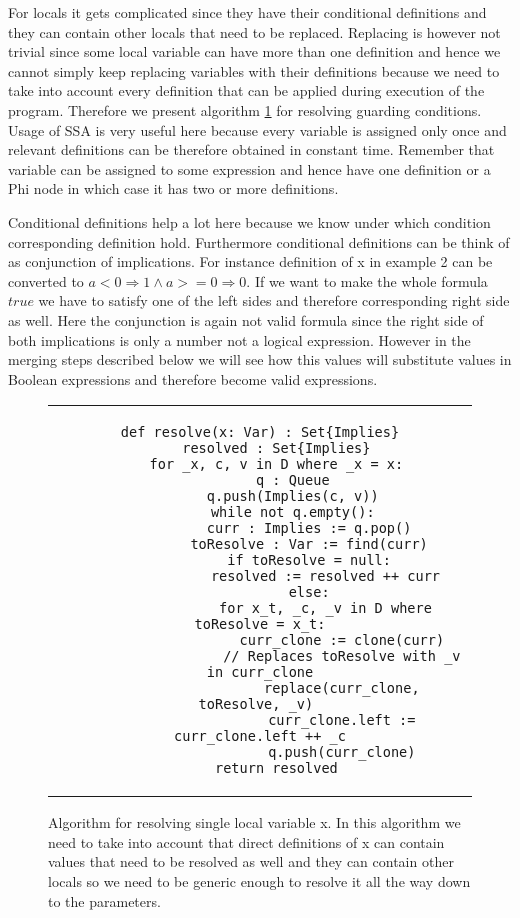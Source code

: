 \documentclass[letterpaper,12pt]{article}
\begin{document}
For locals it gets complicated since they have their conditional definitions and they can contain other locals that need to be replaced. Replacing is however not trivial since some local variable can have more than one definition and hence we cannot simply keep replacing variables with their definitions because we need to take into account every definition that can be applied during execution of the program. Therefore we present algorithm \ref{lst:Resolve} for resolving guarding conditions. Usage of SSA is very useful here because every variable is assigned only once and relevant definitions can be therefore obtained in constant time. Remember that variable can be assigned to some expression and hence have one definition or a Phi node in which case it has two or more definitions.

Conditional definitions help a lot here because we know under which condition corresponding definition hold. Furthermore conditional definitions can be think of as conjunction of implications. For instance definition of x in example 2 can be converted to $a < 0 \Rightarrow 1 \land a >= 0 \Rightarrow 0$. If we want to make the whole formula $true$ we have to satisfy one of the left sides and therefore corresponding right side as well. Here the conjunction is again not valid formula since the right side of both implications is only a number not a logical expression. However in the merging steps described below we will see how this values will substitute values in Boolean expressions and therefore become valid expressions. 

\begin{figure}[thp] %
\centering 
\caption{Algorithm for resolving single local variable x. In this algorithm we need to take into account that direct definitions of x can contain values that need to be resolved as well and they can contain other locals so we need to be generic enough to resolve it all the way down to the parameters.}
\label{lst:Resolve}
\begin{tabular}{c}
\begin{lstlisting}
def resolve(x: Var) : Set{Implies}
    resolved : Set{Implies}
    for _x, c, v in D where _x = x:
        q : Queue
        q.push(Implies(c, v))
        while not q.empty():
            curr : Implies := q.pop()
            toResolve : Var := find(curr)
            if toResolve = null:
                resolved := resolved ++ curr
            else:
                for x_t, _c, _v in D where toResolve = x_t:
                    curr_clone := clone(curr)
                    // Replaces toResolve with _v in curr_clone
                    replace(curr_clone, toResolve, _v) 
                    curr_clone.left := curr_clone.left ++ _c
                    q.push(curr_clone)
    return resolved
\end{lstlisting}
\end{tabular}
\end{figure}
\end{document}
